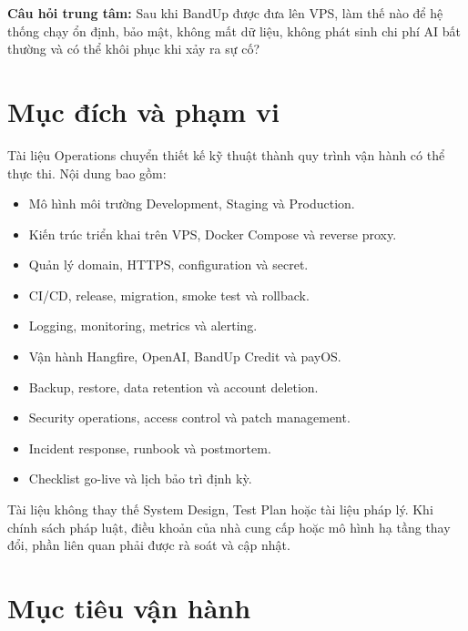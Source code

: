\documentclass[11pt,a4paper]{article}
\begin{document}
\begin{flowbox}
\textbf{Câu hỏi trung tâm:} Sau khi BandUp được đưa lên VPS, làm thế nào để hệ thống chạy ổn định, bảo mật, không mất dữ liệu, không phát sinh chi phí AI bất thường và có thể khôi phục khi xảy ra sự cố?
\end{flowbox}

\tableofcontents
\clearpage

\section{Mục đích và phạm vi}

Tài liệu Operations chuyển thiết kế kỹ thuật thành quy trình vận hành có thể thực thi. Nội dung bao gồm:

\begin{itemize}
  \item Mô hình môi trường Development, Staging và Production.
  \item Kiến trúc triển khai trên VPS, Docker Compose và reverse proxy.
  \item Quản lý domain, HTTPS, configuration và secret.
  \item CI/CD, release, migration, smoke test và rollback.
  \item Logging, monitoring, metrics và alerting.
  \item Vận hành Hangfire, OpenAI, BandUp Credit và payOS.
  \item Backup, restore, data retention và account deletion.
  \item Security operations, access control và patch management.
  \item Incident response, runbook và postmortem.
  \item Checklist go-live và lịch bảo trì định kỳ.
\end{itemize}

Tài liệu không thay thế System Design, Test Plan hoặc tài liệu pháp lý. Khi chính sách pháp luật, điều khoản của nhà cung cấp hoặc mô hình hạ tầng thay đổi, phần liên quan phải được rà soát và cập nhật.

\section{Mục tiêu vận hành}
\end{document}
